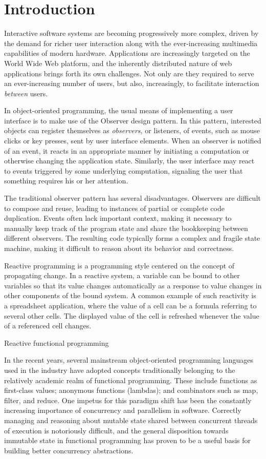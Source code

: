\chapter{Introduction}

Interactive software systems are becoming progressively more complex, driven by the demand for richer user interaction along with the ever-increasing multimedia capabilities of modern hardware. Applications are increasingly targeted on the World Wide Web platform, and the inherently distributed nature of web applications brings forth its own challenges. Not only are they required to serve an ever-increasing number of users, but also, increasingly, to facilitate interaction \emph{between} users. 

In object-oriented programming, the usual means of implementing a user interface is to make use of the Observer design pattern. In this pattern, interested objects can register themselves as \emph{observers}, or listeners, of events, such as mouse clicks or key presses, sent by user interface elements. When an observer is notified of an event, it reacts in an appropriate manner by initiating a computation or otherwise changing the application state. Similarly, the user interface may react to events triggered by some underlying computation, signaling the user that something requires his or her attention.

The traditional observer pattern has several disadvantages. Observers are difficult to compose and reuse, leading to instances of partial or complete code duplication. Events often lack important context, making it necessary to manually keep track of the program state and share the bookkeeping between different observers. The resulting code typically forms a complex and fragile state machine, making it difficult to reason about its behavior and correctness.

Reactive programming is a programming style centered on the concept of propagating change. In a reactive system, a variable can be bound to other variables so that its value changes automatically as a response to value changes in other components of the bound system. A common example of such reactivity is a spreadsheet application, where the value of a cell can be a formula referring to several other cells. The displayed value of the cell is refreshed whenever the value of a referenced cell changes.

Reactive functional programming

In the recent years, several mainstream object-oriented programming languages used in the industry have adopted concepts traditionally belonging to the relatively academic realm of functional programming. These include functions as first-class values; anonymous functions (lambdas); and combinators such as map, filter, and reduce. One impetus for this paradigm shift has been the constantly increasing importance of concurrency and parallelism in software. Correctly managing and reasoning about mutable state shared between concurrent threads of execution is notoriously difficult, and the general disposition towards immutable state in functional programming has proven to be a useful basis for building better concurrency abstractions.

